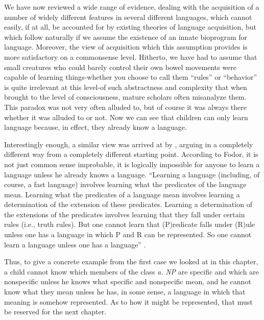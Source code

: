 We have now reviewed a wide range of evidence, dealing with the
acquisition of a number of widely different features in several different languages, which cannot easily, if at all, be accounted for by existing theories of language acquisition, but which follow naturally if we assume the existence of an innate bioprogram for language. Moreover, the view of acquisition which this assumption provides is more satis\-factory on a commonsense level. Hitherto, we have had to assume that small creatures who could barely control their own bowel move\-ments were capable of learning things-whether you choose to call them ``rules'' or ``behavior'' is quite irrelevant at this level-of such abstract\-ness and complexity that when brought to the level of consciousness, mature scholars often misanalyze them. This paradox was not very often alluded to, but of course it was always there whether it was alluded to or not. Now we can see that children can only learn language because, in effect, they already know a language.

Interestingly enough, a similar view was arrived at by \citet{Fodor1975}, arguing in a completely different way from a completely different starting point. According to Fodor, it is not just common sense improbable, it is logically impossible for anyone to learn a lan\-guage unless he already knows a language. ``Learning a language (includ\-ing, of course, a fast language) involves learning what the predicates of the language mean. Learning what the predicates of a language mean involves learning a determination of the extension of these predicates. Learning a determination of the extensions of the predicates involves learning that they fall under certain rules (i.e., truth rules). But one cannot learn that (P)redicate falls under (R)ule unless one has a lan\-guage in which P and R can be represented. So one cannot learn a language unless one has a language'' \citep[63-64]{Fodor1975}.

Thus, to give a concrete example from the first case we looked at in this chapter, a child cannot know which members of the class
\textit{a.} \textit{NP} are specific and which are nonspecific unless he knows what specific and nonspecific mean, and he cannot know what they mean unless he has, in some sense, a language in which that meaning is some\-how represented. As to how it might be represented, that must be
reserved for the next chapter.


